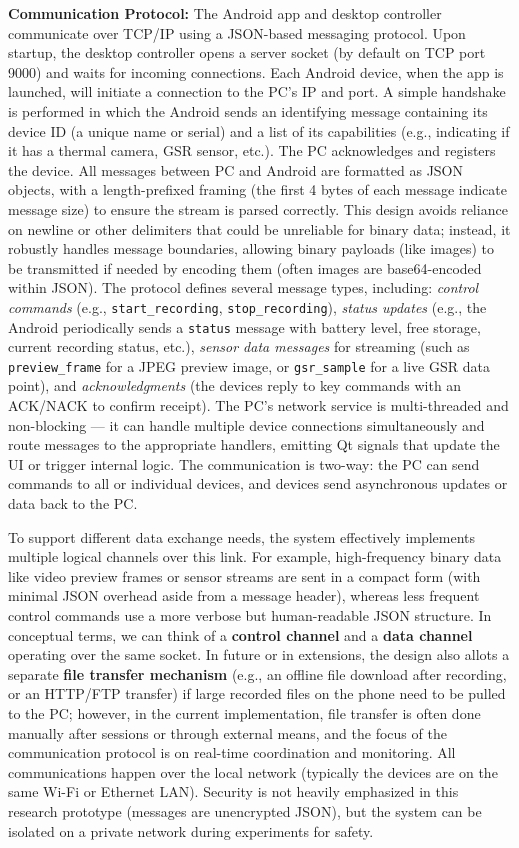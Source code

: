 \documentclass[11pt,a4paper]{report}
\begin{document}
\textbf{Communication Protocol:} The Android app and desktop controller
communicate over TCP/IP using a JSON-based messaging protocol. Upon
startup, the desktop controller opens a server socket (by default on TCP
port 9000) and waits for incoming
connections\cite{TopdonTC001}.
Each Android device, when the app is launched, will initiate a
connection to the PC's IP and port. A simple handshake is performed in
which the Android sends an identifying message containing its device ID
(a unique name or serial) and a list of its capabilities (e.g.,
indicating if it has a thermal camera, GSR sensor,
etc.).
The PC acknowledges and registers the device. All messages between PC
and Android are formatted as JSON objects, with a length-prefixed
framing (the first 4 bytes of each message indicate message size) to
ensure the stream is parsed
correctly.
This design avoids reliance on newline or other delimiters that could be
unreliable for binary data; instead, it robustly handles message
boundaries, allowing binary payloads (like images) to be transmitted if
needed by encoding them (often images are base64-encoded within
JSON).
The protocol defines several message types, including: \textit{control
commands} (e.g., \texttt{start\_recording}, \texttt{stop\_recording}), \textit{status updates}
(e.g., the Android periodically sends a \texttt{status} message with battery
level, free storage, current recording status, etc.), \textit{sensor data
messages} for streaming (such as \texttt{preview\_frame} for a JPEG preview
image, or \texttt{gsr\_sample} for a live GSR data point), and \textit{acknowledgments}
(the devices reply to key commands with an ACK/NACK to confirm
receipt).
The PC's network service is multi-threaded and non-blocking --- it can
handle multiple device connections simultaneously and route messages to
the appropriate handlers, emitting Qt signals that update the UI or
trigger internal logic. The communication is two-way: the PC can send
commands to all or individual devices, and devices send asynchronous
updates or data back to the PC.

To support different data exchange needs, the system effectively
implements multiple logical channels over this link. For example,
high-frequency binary data like video preview frames or sensor streams
are sent in a compact form (with minimal JSON overhead aside from a
message header), whereas less frequent control commands use a more
verbose but human-readable JSON structure. In conceptual terms, we can
think of a \textbf{control channel} and a \textbf{data channel} operating over the
same socket. In future or in extensions, the design also allots a
separate \textbf{file transfer mechanism} (e.g., an offline file download
after recording, or an HTTP/FTP transfer) if large recorded files on the
phone need to be pulled to the PC; however, in the current
implementation, file transfer is often done manually after sessions or
through external means, and the focus of the communication protocol is
on real-time coordination and monitoring. All communications happen over
the local network (typically the devices are on the same Wi-Fi or
Ethernet LAN). Security is not heavily emphasized in this research
prototype (messages are unencrypted JSON), but the system can be
isolated on a private network during experiments for safety.
\end{document}
